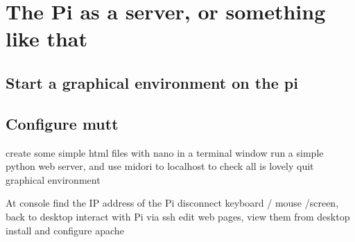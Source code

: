 \chapter{The Pi as a server, or something like that}

\section{Start a graphical environment on the pi}

\section{Configure mutt}

create some simple html files with nano in a terminal window
run a simple python web server, and use midori to localhost to check all is lovely
quit graphical environment

At console
find the IP address of the Pi
disconnect keyboard / mouse /screen, back to desktop
interact with Pi via ssh
edit web pages, view them from desktop
install and configure apache

